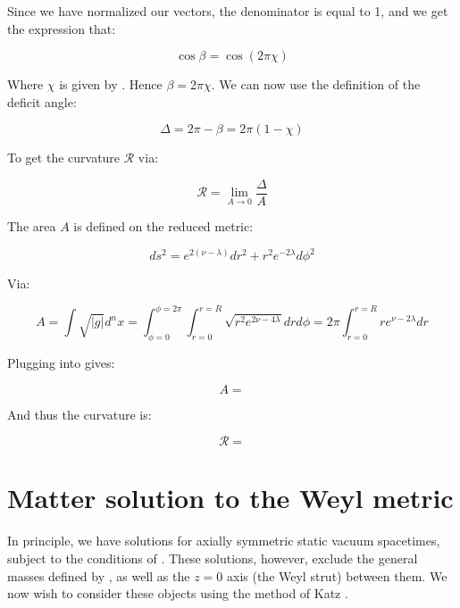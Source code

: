 \documentclass{article}
\begin{document}
Since we have normalized our vectors, the denominator is equal to 1, and we get the expression that:

\begin{equation}
\cos\beta=\cos(2\pi\chi)
\end{equation}

Where $\chi$ is given by . Hence $\beta=2\pi\chi$. We can now use the definition of the deficit angle:

\begin{equation}
\label{eq:deficit-angle}
\Delta=2\pi-\beta=2\pi(1-\chi)
\end{equation}

To get the curvature $\mathcal{R}$ via:

\begin{equation}
\label{eq:curvature}
\mathcal{R}=\lim_{A\rightarrow 0}\frac{\Delta}{A}
\end{equation}

The area $A$ is defined on the reduced metric:

\begin{equation}
ds^2=e^{2(\nu-\lambda)}dr^2+r^2 e^{-2\lambda}d\phi^2
\end{equation}

Via:

\begin{equation}
\label{eq:area}
A=\int\sqrt{|g|}d^n x=\int_{\phi=0}^{\phi=2\pi}\int_{r=0}^{r=R}\sqrt{r^2 e^{2\nu-4\lambda}}drd\phi=2\pi\int_{r=0}^{r=R}re^{\nu-2\lambda}dr
\end{equation}

Plugging  into  gives:

\begin{equation}
\label{eq:area-solved}
A=
\end{equation}

And thus the curvature is:

\begin{equation}
\label{eq:curvature-solved}
\mathcal{R}=
\end{equation}

\section{Matter solution to the Weyl metric}
\label{sec:matter-solution}

In principle, we have solutions for axially symmetric static vacuum spacetimes, subject to the conditions of . These solutions, however, exclude the general masses defined by , as well as the $z=0$ axis (the Weyl strut) between them. We now wish to consider these objects using the method of Katz \cite{katz1967derivation}. 
\end{document}
